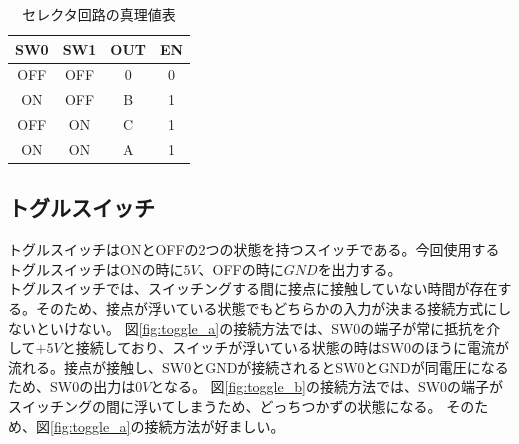 \documentclass[a4paper,11pt,dvipdfmx]{jsarticle}
\begin{document}
\begin{table}[H]
\centering
\caption{セレクタ回路の真理値表}
\label{tab:selector}
\begin{tabular}{|cc|cc|}
  \hline
  SW0 & SW1 & OUT & EN\\
  \hline
  OFF & OFF & 0 & 0\\
  ON  & OFF & B & 1\\
  OFF & ON  & C & 1\\
  ON  & ON  & A & 1\\
  \hline
\end{tabular}
\end{table}

\subsection{トグルスイッチ}
トグルスイッチはONとOFFの2つの状態を持つスイッチである。今回使用するトグルスイッチはONの時に$5V$、OFFの時に$GND$を出力する。
\\
トグルスイッチでは、スイッチングする間に接点に接触していない時間が存在する。そのため、接点が浮いている状態でもどちらかの入力が決まる接続方式にしないといけない。
図\ref{fig:toggle_a}の接続方法では、SW0の端子が常に抵抗を介して$+5V$と接続しており、スイッチが浮いている状態の時はSW0のほうに電流が流れる。接点が接触し、SW0とGNDが接続されるとSW0とGNDが同電圧になるため、SW0の出力は$0V$となる。
図\ref{fig:toggle_b}の接続方法では、SW0の端子がスイッチングの間に浮いてしまうため、どっちつかずの状態になる。
そのため、図\ref{fig:toggle_a}の接続方法が好ましい。
\end{document}

